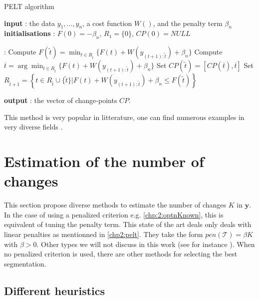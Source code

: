 \begin{algorithm}[ht]
\caption{PELT algorithm}\label{chp2:algo:pelt}
\begin{algorithmic}

\State \textbf{input} : the data $y_{1},...,y_{n}$, a cost function $W()$, and the penalty term $\beta_{n}$ \\
  
\State \textbf{initialisations} : $F(0)=-\beta_{n}$, $R_{1}=\lbrace 0\rbrace$, $CP(0)=NULL$  
  
 :
  \State Compute 
  $ F(\tilde t)=\min_{t\in R_{\tilde t}}\lbrace F(t)+W(y_{(t+1):\tilde t})+\beta_{n}\rbrace $
  \State Compute $ \overline t=\arg \min_{t\in R_{\tilde t}}\lbrace F(t)+W(y_{(t+1):\tilde t})+\beta_{n}\rbrace $ 
  \State Set $CP(\tilde t)=[CP(\overline t), \overline t]$
  \State Set $R_{\tilde t+1}=\left\{t\in R_{\tilde t}\cup \lbrace\tilde t\rbrace \vert F(t)+W(y_{(t+1):\tilde t}) +\beta_{n} \le F(\tilde t)   \right\}$ 
\EndFor 
   
\State \textbf{output} : the vector of change-points $CP$. 
 
\end{algorithmic}
\end{algorithm} 

This method is very popular in litterature, one can find numerous examples in very diverse fields \cite{Wang2015,Wang2021,Kosta2015}.

\section{Estimation of the number of changes}\label{chp2:nb_change}

This section propose diverse methods to estimate the number of changes $K$ in $\bm y$. In the case of using a penalized criterion e.g. \ref{chp:2:optnKnown}, this is equivalent of tuning the penalty term. This state of the art deals only deals with linear penalties as mentionned in \ref{chp2:pelt}. They take the form $pen(\mathcal{T}) = \beta K$ with $\beta > 0$. Other types we will not discuss in this work (see for instance \cite{Harchaoui2010,Zhang2006,NIPS2010}). When no penalized criterion is used, there are other methods for selecting the best segmentation. 

\subsection{Different heuristics}\label{chp2:pencal}

